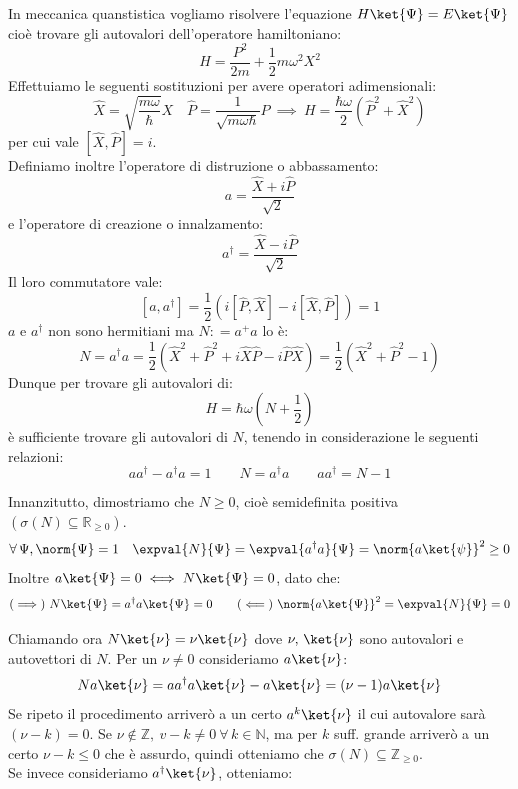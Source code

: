 In meccanica quanstistica vogliamo risolvere l'equazione \(H\ket{\Psi} = E\ket{\Psi}\) cioè trovare gli autovalori dell'operatore hamiltoniano:
\begin{equation}
    H = \frac{P^2}{2m} + \frac{1}{2} m \omega^2 X^2
\end{equation}
Effettuiamo le seguenti sostituzioni per avere operatori adimensionali:
\begin{equation}
    \hat{X} = \sqrt{\frac{m\omega}{\hbar}}X \quad \hat{P} = \frac{1}{\sqrt{m\omega \hbar}}P  \
        \implies  \ H = \frac{\hbar \omega}{2} ( \hat{P}^2 + \hat{X}^2)
\end{equation}
per cui vale \(\left[ \hat{X}, \hat{P} \right]= i\).\\
Definiamo inoltre l'operatore di distruzione o abbassamento:
\begin{equation}
    a = \frac{\hat{X}+ i\hat{P}}{\sqrt{2}}
\end{equation}
e l'operatore di creazione o innalzamento:
\begin{equation}
    a^\dagger = \frac{\hat{X}-i \hat{P}}{\sqrt{2}}
\end{equation}
Il loro commutatore vale:
\begin{equation}
    \left[ a,a^\dagger \right] = \frac{1}{2}\left( i\left[ \hat{P},\hat{X} \right]-i\left[ \hat{X}, \hat{P} \right]\right)    = 1
\end{equation}
\(a\) e \(a^\dagger\) non sono hermitiani ma \(N : = a ^+a\) lo è:
\begin{equation}
    N = a^\dagger a = \frac{1}{2}\left( \hat{X}^2+\hat{P}^2 + i \hat{X}\hat{P} - i\hat{P}\hat{X}\right) = \frac{1}{2}\left( \hat{X}^2 + \hat{P}^2-1\right)
\end{equation}
Dunque per trovare gli autovalori di:
\[
    H = \hbar\omega\left(N + \frac{1}{2}\right)
\]
è sufficiente trovare gli autovalori di \(N\), tenendo in considerazione le seguenti relazioni:
\[
    aa^\dagger - a^\dagger a = 1 \qquad N = a^\dagger a \qquad aa^\dagger = N-1
\]

Innanzitutto, dimostriamo che \(N \geq 0 \), cioè semidefinita positiva \((\sigma(N)\subseteq \mathbb{R}_{\geq0})\).
\[
    \forall \,\Psi , \norm{\Psi} = 1 \quad \expval{N}{\Psi} = \expval{a^\dagger a}{\Psi} = \norm{a\ket{\psi}}^2 \geq0
\]
Inoltre \(a\ket{\Psi}= 0 \iff N\ket{\Psi}= 0\), dato che:
\[
   (\implies) \ N\ket{\Psi} = a^\dagger a \ket{\Psi} = 0 \qquad (\impliedby)\  \norm{a\ket{\Psi}}^2 = \expval{N}{\Psi} = 0
\]

Chiamando ora \(N\ket{\nu}= \nu \ket{\nu}\) dove \(\nu, \,\ket{\nu}\) sono autovalori e autovettori di \(N\). 
Per un \(\nu \neq 0 \) consideriamo \(a\ket{\nu}\):
\begin{equation}
    Na\ket{\nu}= a a^\dagger a \ket{\nu}- a\ket{\nu} = (\nu-1)a\ket{\nu}
\end{equation}
Se ripeto il procedimento arriverò a un certo \(a^k\ket{\nu}\) il cui autovalore sarà \((\nu-k)=0\).
Se \(\nu \notin \mathbb{Z}, \ v-k \neq 0 \ \forall \,k \in \mathbb{N}\), ma per \(k\) suff. grande arriverò a un certo \(\nu-k\leq0\) che è assurdo,
quindi otteniamo che \(\sigma(N)\subseteq \mathbb{Z}_{\geq0}\).\\
Se invece consideriamo \(a^\dagger\ket{\nu}\), otteniamo:

